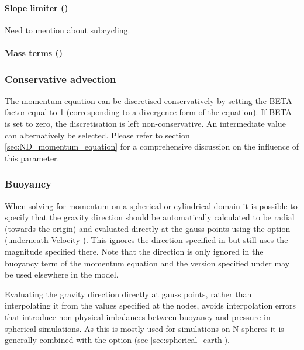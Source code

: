 \paragraph{Slope limiter ()}
Need to mention about subcycling.
\paragraph{Mass terms ()}

\subsubsection{Conservative advection}

The momentum equation can be discretised conservatively by setting the
BETA factor equal to 1 (corresponding to a divergence form of the
equation). If BETA is set to zero, the discretisation is left
non-conservative. An intermediate value can alternatively be
selected. Please refer to section \ref{sec:ND_momentum_equation} for a comprehensive discussion on the influence of this parameter.

\subsubsection{Buoyancy}
\label{sec:configuring_fluidity!spatial_discretisation!buoyancy}

When solving for momentum on a spherical or cylindrical domain it is possible to specify that the gravity direction should be automatically
calculated to be radial (towards the origin) and evaluated directly at the gauss points using the
 option (underneath Velocity ).  This
ignores the direction specified in  but still uses the magnitude specified there.  Note
that the direction is only ignored in the buoyancy term of the momentum equation and the version specified under
 may be used elsewhere in the model.

Evaluating the gravity direction directly at gauss points, rather than interpolating it from the values specified at the nodes,
avoids interpolation errors that introduce non-physical imbalances between buoyancy and pressure in spherical simulations.  As this
is mostly used for simulations on N-spheres it is generally combined with the  option (see
\ref{sec:spherical_earth}).

